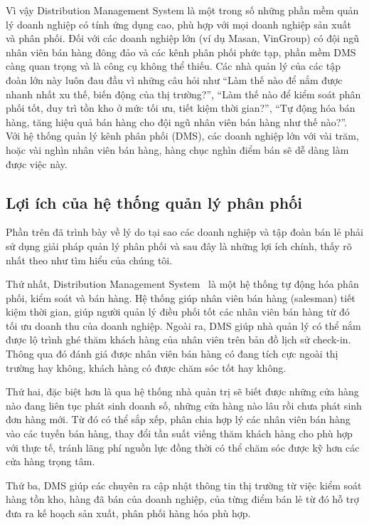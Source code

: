 Vì vậy Distribution Management System là một trong số những
phần mềm quản lý doanh nghiệp có tính ứng dụng cao, phù hợp với mọi
doanh nghiệp sản xuất và phân phối. Đối với các doanh nghiệp lớn
(ví dụ Masan, VinGroup) có đội ngũ nhân viên bán hàng đông đảo và các
kênh phân phối phức tạp, phần mềm DMS càng quan trọng và là công cụ không
thể thiếu. Các nhà quản lý của các tập đoàn lớn này luôn đau đầu vì
những câu hỏi như “Làm thế nào để nắm được nhanh nhất xu thế, biến động
của thị trường?”, “Làm thế nào để kiểm soát phân phối tốt, duy
trì tồn kho ở mức tối ưu, tiết kiệm thời gian?”, “Tự động hóa bán
hàng, tăng hiệu quả bán hàng cho đội ngũ nhân viên bán hàng như
thế nào?”. Với hệ thống quản lý kênh phân phối (DMS), các doanh nghiệp
lớn với vài trăm, hoặc vài nghìn nhân viên bán hàng, hàng chục
nghìn điểm bán sẽ dễ dàng làm được việc này.

\subsection{Lợi ích của hệ thống quản lý phân phối}
Phần trên đã trình bày về lý do tại sao các doanh nghiệp và tập
đoàn bán lẻ phải sử dụng giải pháp quản lý phân phối và sau đây
là những lợi ích chính, thấy rõ nhất theo như tìm hiểu của chúng tôi.

Thứ nhất, Distribution Management System~\cite{dms:online}
là một hệ thống tự động hóa phân phối, kiểm soát và bán hàng. Hệ
thống giúp nhân viên bán hàng (salesman) tiết kiệm thời gian, giúp
người quản lý điều phối tốt các nhân viên bán hàng từ đó
tối ưu doanh thu của doanh nghiệp. Ngoài ra, DMS giúp
nhà quản lý có thể nắm được lộ
trình ghé thăm khách hàng của nhân viên trên bản đồ lịch sử check-in.
Thông qua đó đánh giá được nhân viên bán hàng có đang tích cực
ngoài thị trường hay không, khách hàng có được chăm sóc tốt hay không.

Thứ hai, đặc biệt hơn là qua hệ thống nhà quản trị sẽ biết
được những cửa hàng nào đang liên tục phát sinh doanh số, những cửa hàng
nào lâu rồi chưa phát sinh đơn hàng mới. Từ đó có thể sắp xếp,
phân chia hợp lý các nhân viên bán hàng vào các tuyến bán
hàng, thay đổi tần suất viếng thăm khách hàng cho phù hợp với
thực tế, tránh lãng phí nguồn lực đồng thời có thể chăm sóc được kỹ
hơn các cửa hàng trọng tâm.

Thứ ba, DMS giúp các chuyên ra cập nhật thông tin thị trường từ
việc kiểm soát hàng tồn kho, hàng đã bán của doanh nghiệp,
của từng điểm bán lẻ
từ đó hỗ trợ đưa ra kế hoạch sản xuất, phân phối hàng hóa phù hợp.

